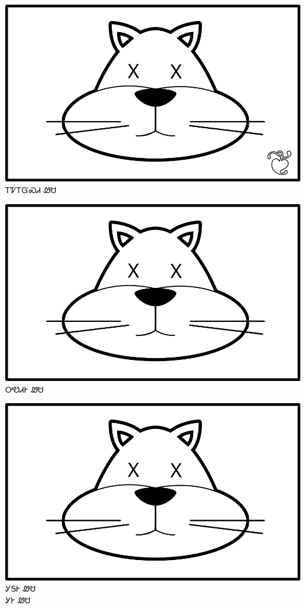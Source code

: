 \documentclass[avery5371]{flashcards}%
\begin{document}
    \begin{flashcard}{
        \includegraphics[width=0.95\columnwidth,height=.51\columnwidth,keepaspectratio]{../artwork/for-colors/wesa-dead-with-leaf}
    }
        \Huge ᎢᏤᎢᏳᏍᏗ ᏪᏌ
    \end{flashcard}

    \begin{flashcard}{
        \includegraphics[width=0.95\columnwidth,height=.51\columnwidth,keepaspectratio]{../artwork/for-colors/wesa-dead}
    }
        \Huge ᎤᏬᏗᎨ ᏪᏌ
    \end{flashcard}

    \begin{flashcard}{
        \includegraphics[width=0.95\columnwidth,height=.51\columnwidth,keepaspectratio]{../artwork/for-colors/wesa-dead}
    }
        \Huge ᎩᎦᎨ ᏪᏌ\\ᎩᎨ ᏪᏌ
    \end{flashcard}
\end{document}
